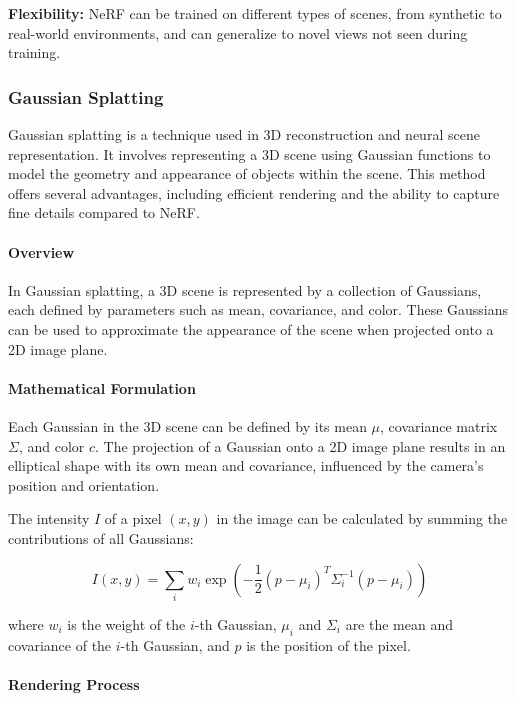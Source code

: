 \documentclass[12pt]{article}
\begin{document}
\textbf{Flexibility:} NeRF can be trained on different types of scenes, from synthetic to real-world environments, and can generalize to novel views not seen during training.

\subsubsection{Gaussian Splatting}

Gaussian splatting is a technique used in 3D reconstruction and neural scene representation. It involves representing a 3D scene using Gaussian functions to model the geometry and appearance of objects within the scene. This method offers several advantages, including efficient rendering and the ability to capture fine details compared to NeRF.

\paragraph{Overview}

In Gaussian splatting, a 3D scene is represented by a collection of Gaussians, each defined by parameters such as mean, covariance, and color. These Gaussians can be used to approximate the appearance of the scene when projected onto a 2D image plane.

\paragraph{Mathematical Formulation}

Each Gaussian in the 3D scene can be defined by its mean \( \mu \), covariance matrix \( \Sigma \), and color \( c \). The projection of a Gaussian onto a 2D image plane results in an elliptical shape with its own mean and covariance, influenced by the camera's position and orientation.

The intensity \( I \) of a pixel \( (x, y) \) in the image can be calculated by summing the contributions of all Gaussians:

\[
I(x, y) = \sum_{i} w_i \exp \left( -\frac{1}{2} (p - \mu_i)^T \Sigma_i^{-1} (p - \mu_i) \right)
\]

where \( w_i \) is the weight of the \(i\)-th Gaussian, \( \mu_i \) and \( \Sigma_i \) are the mean and covariance of the \(i\)-th Gaussian, and \( p \) is the position of the pixel.

\paragraph{Rendering Process}
\end{document}
